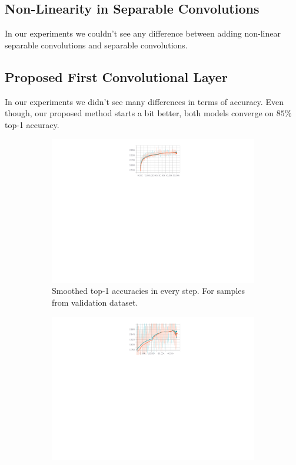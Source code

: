 \subsection{Non-Linearity in Separable Convolutions}
In our experiments we couldn't see any difference between adding non-linear separable convolutions and separable convolutions. 

\subsection{Proposed First Convolutional Layer}
In our experiments we didn't see many differences in terms of accuracy. Even though, our proposed method starts a bit better, both models converge on $85\%$ top-1 accuracy. 
\begin{figure}
  \vspace{-45px}
  \centering
  \begin{subfigure}{.79\textwidth}
        \includegraphics[width=1\linewidth]{images/proposed_conv_comparison_evaluation.pdf}
        \caption{Smoothed top-1 accuracies in every step. For samples from validation dataset.}
        \label{fig:conv-comparison-proposed-full}
  \end{subfigure}
  \begin{subfigure}{.79\textwidth}
        \includegraphics[width=1\linewidth]{images/proposed_conv_comparison_evaluation_zoomed.pdf}

\end{subfigure}
\end{figure}
